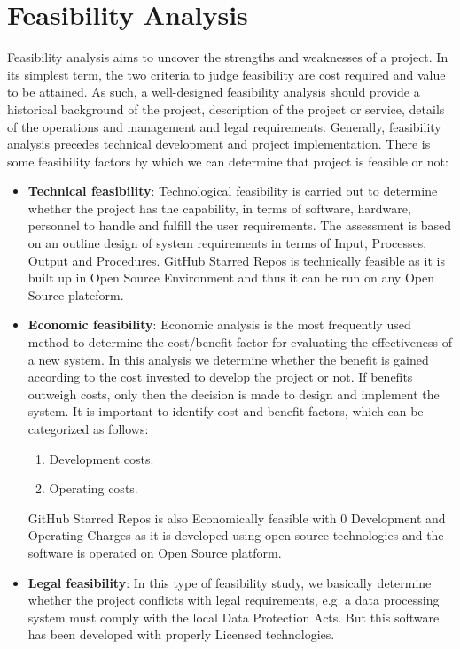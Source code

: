 \section{Feasibility Analysis}
Feasibility analysis aims to uncover the strengths and weaknesses of 
a project. In its simplest term, the two criteria to judge feasibility 
are cost required and value to be attained. As such, a well-designed 
feasibility analysis should provide a historical background of the 
project, description of the project or service, details of the 
operations and management and legal requirements. Generally, feasibility 
analysis precedes technical development and project implementation. 
There is some feasibility factors by which we can determine that 
project is feasible or not:
\begin{itemize}
\item {\bf{Technical feasibility}}: Technological feasibility is carried 
out to determine whether the project has the capability, in terms of 
software, hardware, personnel to handle and fulfill the user 
requirements. The assessment is based on an outline design of system 
requirements in terms of Input, Processes, Output and Procedures. GitHub Starred Repos is technically feasible as it is built up in Open 
Source Environment and thus it can be run on any Open Source plateform.
\item {\bf{Economic feasibility}}: Economic analysis is the most 
frequently used method to determine the cost/benefit factor for 
evaluating the effectiveness of a new system. In this analysis we 
determine whether the benefit is gained according to the cost invested 
to develop the project or not. If benefits outweigh costs, only then 
the decision is made to design and implement the system. It is 
important to identify cost and benefit factors, which can be categorized 
as follows:
\begin{enumerate}
\item Development costs.
\item Operating costs.
\end{enumerate}
GitHub Starred Repos is also Economically feasible with 0 Development 
and Operating Charges as it is developed using open source technologies and the software is operated on Open 
Source platform.
\item {\bf {Legal feasibility}}: In this type of feasibility study, we 
basically determine whether the project conflicts with legal 
requirements, e.g. a data processing system must comply with the local 
Data Protection Acts. But this software has been developed with properly Licensed technologies. 

\end{itemize}
